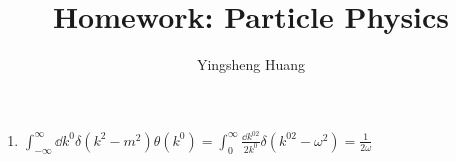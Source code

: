 \documentclass{article}
\title{Homework: Particle Physics}
\author{Yingsheng Huang}
\begin{document}
\maketitle
\begin{enumerate}[\bf1.]
  \item $\int_{-\infty}^{\infty}\dd k^0\delta(k^2-m^2)\theta(k^0)=\int_{0}^{\infty}\frac{\dd k^{02}}{2k^0}\delta(k^{02}-\omega^2)=\frac{1}{2\omega}$


\end{enumerate}
\end{document}
